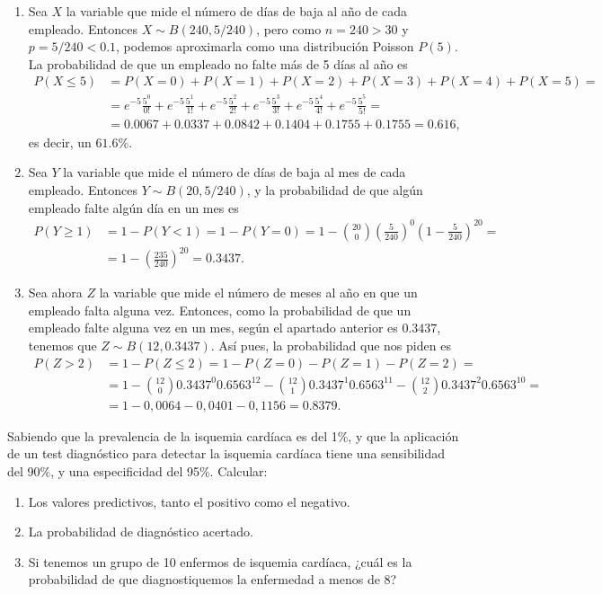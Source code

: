 {
\begin{enumerate}
\item Sea $X$ la variable que mide el número de días de baja al año de cada empleado. Entonces \mbox{$X\sim B(240,5/240)$}, pero como
$n=240>30$ y $p=5/240<0.1$, podemos aproximarla como una distribución Poisson $P(5)$. La probabilidad de que un empleado no falte más de 5
días al año es
\begin{align*}
P(X\leq 5)&= P(X=0)+P(X=1)+P(X=2)+P(X=3)+P(X=4)+P(X=5)= \\
&= e^{-5}\frac{5^0}{0!}+
e^{-5}\frac{5^1}{1!}+e^{-5}\frac{5^2}{2!}+e^{-5}\frac{5^3}{3!}
+e^{-5}\frac{5^4}{4!}+e^{-5}\frac{5^5}{5!}= \\
&= 0.0067+0.0337+0.0842+0.1404+0.1755+0.1755=0.616,
\end{align*}
es decir, un $61.6\%$.

\item Sea $Y$ la variable que mide el número de días de baja al mes de cada empleado. Entonces \mbox{$Y\sim B(20,5/240)$}, y la
probabilidad de que algún empleado falte algún día en un mes es
\begin{align*}
P(Y\geq1)&=1-P(Y<1)=1-P(Y=0)=
1-\binom{20}{0}\left(\frac{5}{240}\right)^0\left(1-\frac{5}{240}\right)^{20}= \\
&=1-\left(\frac{235}{240}\right)^{20}=0.3437.
\end{align*}

\item Sea ahora $Z$ la variable que mide el número de meses al año en que un empleado falta alguna vez. Entonces, como la probabilidad de
que un empleado falte alguna vez en un mes, según el apartado anterior es $0.3437$, tenemos que $Z\sim B(12,0.3437)$. Así pues, la
probabilidad que nos piden  es
\begin{align*}
P(Z>2)&=1-P(Z\leq 2)=1-P(Z=0)-P(Z=1)-P(Z=2)=\\
&= 1-\binom{12}{0}0.3437^0 0.6563^{12}-\binom{12}{1}0.3437^1 0.6563^{11}-
\binom{12}{2}0.3437^2 0.6563^{10}=\\
&=1-0,0064-0,0401-0,1156=0.8379.
\end{align*}
\end{enumerate}
}


{Sabiendo que la prevalencia de la isquemia cardíaca es del 1\%, y que la aplicación de un test diagnóstico para detectar la isquemia
cardíaca tiene una sensibilidad del 90\%, y una especificidad del 95\%. Calcular:
\begin{enumerate}
\item Los valores predictivos, tanto el positivo como el negativo.
\item La probabilidad de diagnóstico acertado.
\item Si tenemos un grupo de 10 enfermos de isquemia cardíaca, ¿cuál es la probabilidad de que diagnostiquemos la enfermedad a
menos de 8?
\end{enumerate}
} 
{
}
{
}


